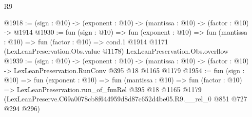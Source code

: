 \begin{lexlean}{R9}
\begin{coremodule}
@1918 := (sign : @10) -> (exponent : @10) -> (mantissa : @10) -> (factor : @10) -> @1914
@1930 := fun (sign : @10) =>
  fun (exponent : @10) =>
  fun (mantissa : @10) =>
  fun (factor : @10) =>
  cond.{1} @1914 @1171 (LexLeanPreservation.Obs.value @1178) LexLeanPreservation.Obs.overflow
@1939 := (sign : @10) ->
  (exponent : @10) ->
  (mantissa : @10) -> (factor : @10) -> LexLeanPreservation.RunConv @395 @18 @1165 @1179
@1954 := fun (sign : @10) =>
  fun (exponent : @10) =>
  fun (mantissa : @10) =>
  fun (factor : @10) =>
  LexLeanPreservation.run_of_funRel
    @395
    @18
    @1165
    @1179
    (LexLeanPreserve.C69a0078cb8f644959d8d87c652d4be05.R9.__rel_0 @851 @727 @294 @296)
\end{coremodule}
\end{lexlean}
